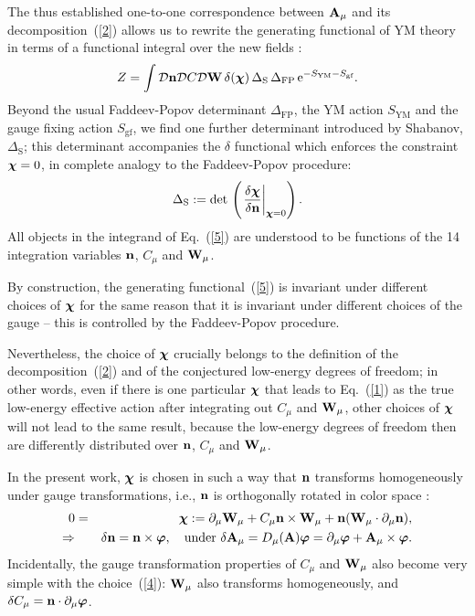 \documentclass[a4paper,12pt]{article}
\newcommand{\E}{\text{e}}
\newcommand{\re}[1]{~(\ref{#1})}
\begin{document}
The thus established one-to-one correspondence between $\mathbf{A}_\mu$ and
its decomposition\re{2} allows us to rewrite the generating functional
of YM theory in terms of a functional integral over the new fields
\cite{Shabanov:1999xy,Shabanov:1999uv}:
\begin{equation}
Z=\int{\cal D}\mn{\cal D}C{\cal D}\mW\, \delta(\mX)\,
\Delta_{\text{S}}\, \Delta_{\text{FP}}\,\E^{-S_{\text{YM}}
  -S_{\text{gf}}}.\label{5} 
\end{equation}
Beyond the usual Faddeev-Popov determinant $\Delta_{\text{FP}}$, the
YM action $S_{\text{YM}}$ and the gauge fixing action $S_{\text{gf}}$,
we find one further determinant introduced by Shabanov, 
$\Delta_{\text{S}}$; this determinant accompanies the $\delta$
functional which enforces the constraint $\boldsymbol{\chi}=0$, in complete analogy
to the Faddeev-Popov procedure:
\begin{equation}
\Delta_{\text{S}}:= \text{det}\, \left(\left.\frac{\delta \boldsymbol{\chi}}{\delta
      \mathbf{n}} \right|_{\boldsymbol{\chi}=0} \right). \label{6}
\end{equation}
All objects in the integrand of Eq.\re{5} are understood to be
functions of the 14 integration variables $\mathbf{n}$, $C_\mu$ and
$\mathbf{W}_\mu$.

By construction, the generating functional\re{5} is invariant under
different choices of $\boldsymbol{\chi}$ for the same reason that it is invariant
under different choices of the gauge -- this is controlled by the
Faddeev-Popov procedure.

Nevertheless, the choice of $\boldsymbol{\chi}$ crucially belongs to the definition
of the decomposition\re{2} and of the conjectured low-energy degrees
of freedom; in other words, even if there is one particular $\boldsymbol{\chi}$ that
leads to Eq.\re{1} as the true low-energy effective action after
integrating out $C_\mu$ and $\mathbf{W}_\mu$, other choices of $\boldsymbol{\chi}$ will not
lead to the same result, because the low-energy degrees of freedom
then are differently distributed over $\mathbf{n}$, $C_\mu$ and $\mathbf{W}_\mu$.

In the present work, $\boldsymbol{\chi}$ is chosen in such a way that
$\mathbf{n}$ transforms homogeneously under gauge transformations, i.e.,
$\mathbf{n}$ is orthogonally rotated in color space \cite{Cho:1980nv}:
\begin{eqnarray}
0&=&\boldsymbol{\chi}:= \partial_\mu\mathbf{W}_\mu+ C_\mu\mathbf{n}\times\mathbf{W}_\mu +\mathbf{n} (\mathbf{W}_\mu\cdot
\partial_\mu\mathbf{n}), \label{4}\\
\Rightarrow&&\delta\mathbf{n}=\mathbf{n}\times \boldsymbol{\varphi},
\quad\text{under}\,\,\delta
\mathbf{A}_\mu=D_\mu(\mathbf{A})\boldsymbol{\varphi}=\partial_\mu \boldsymbol{\varphi}
+\mathbf{A}_\mu\times\boldsymbol{\varphi}. \nonumber
\end{eqnarray}
Incidentally, the gauge transformation properties of $C_\mu$ and
$\mathbf{W}_\mu$ also become very simple with the choice\re{4}: $\mathbf{W}_\mu$
also transforms homogeneously, and $\delta C_\mu=\mathbf{n}\cdot\partial_\mu
\boldsymbol{\varphi}$. 
\end{document}
